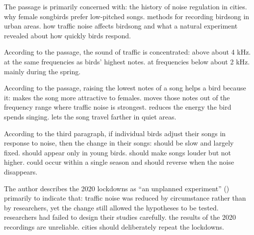 \documentclass[11pt]{article}
\begin{document}
{The passage is primarily concerned with:}
{the history of noise regulation in cities.}
{why female songbirds prefer low-pitched songs.}
{methods for recording birdsong in urban areas.}
{how traffic noise affects birdsong and what a natural experiment revealed about how quickly birds respond.}

{According to the passage, the sound of traffic is concentrated:}
{above about 4 kHz.}
{at the same frequencies as birds' highest notes.}
{at frequencies below about 2 kHz.}
{mainly during the spring.}

{According to the passage, raising the lowest notes of a song helps a bird because it:}
{makes the song more attractive to females.}
{moves those notes out of the frequency range where traffic noise is strongest.}
{reduces the energy the bird spends singing.}
{lets the song travel farther in quiet areas.}

{According to the third paragraph, if individual birds adjust their songs in response to noise, then the change in their songs:}
{should be slow and largely fixed.}
{should appear only in young birds.}
{should make songs louder but not higher.}
{could occur within a single season and should reverse when the noise disappears.}

{The author describes the 2020 lockdowns as ``an unplanned experiment'' () primarily to indicate that:}
{traffic noise was reduced by circumstance rather than by researchers, yet the change still allowed the hypotheses to be tested.}
{researchers had failed to design their studies carefully.}
{the results of the 2020 recordings are unreliable.}
{cities should deliberately repeat the lockdowns.}
\end{document}
